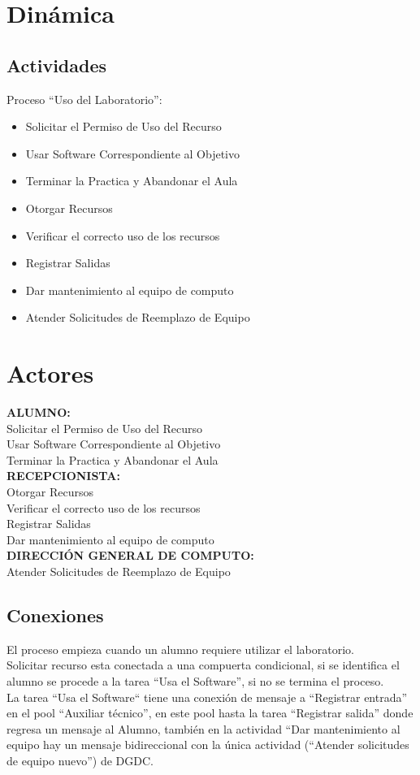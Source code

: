\documentclass[spanish,12pt,letterpapper]{article}
\begin{document}
	\section{Dinámica}
	\subsection{Actividades}
	Proceso ``Uso del Laboratorio'':\\
	
	\begin{itemize}
	\item Solicitar el Permiso de Uso del Recurso
	\item Usar Software Correspondiente al Objetivo
	\item Terminar la Practica y Abandonar el Aula
	\item Otorgar Recursos
	\item Verificar el correcto uso de los recursos
	\item Registrar Salidas
	\item Dar mantenimiento al equipo de computo
	\item Atender Solicitudes de Reemplazo de Equipo
	\end{itemize}
	
	\section{Actores}
	
		\textbf{ALUMNO:\\}	
	Solicitar el Permiso de Uso del Recurso\\
	Usar Software Correspondiente al Objetivo\\
	Terminar la Practica y Abandonar el Aula\\
	
	\textbf{RECEPCIONISTA:\\}	
	Otorgar Recursos\\
	Verificar el correcto uso de los recursos\\
	Registrar Salidas\\
	Dar mantenimiento al equipo de computo\\

	\textbf{DIRECCIÓN GENERAL DE COMPUTO:\\}
	Atender Solicitudes de Reemplazo de Equipo
	
	\subsection{Conexiones}
	El proceso empieza cuando un alumno requiere utilizar el laboratorio.\\
	Solicitar recurso esta conectada a una compuerta condicional, si se identifica el alumno se procede a la tarea ``Usa el Software'', si no se termina el proceso.\\
	La tarea ``Usa el Software`` tiene una conexión de mensaje a ``Registrar entrada'' en el pool ``Auxiliar técnico'', en este pool hasta la tarea ``Registrar salida'' donde regresa un mensaje al Alumno, también en la actividad ``Dar mantenimiento al equipo hay un mensaje bidireccional con la única actividad (``Atender solicitudes de equipo nuevo'') de DGDC.
	
\end{document}
